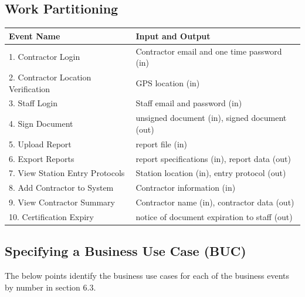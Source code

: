 \documentclass[12pt]{article}
\begin{document}
\subsection{Work Partitioning}
\begin{tabular}{|l|l|}
\hline
\textbf{Event Name} & \textbf{Input and Output} \\
\hline
1. Contractor Login & Contractor email and one time password (in) \\
\hline
2. Contractor Location Verification & GPS location (in) \\
\hline
3. Staff Login & Staff email and password (in) \\
\hline
4. Sign Document & unsigned document (in), signed document (out) \\
\hline
5. Upload Report & report file (in) \\
\hline
6. Export Reports & report specifications (in), report data (out)\\
\hline
7. View Station Entry Protocols & Station location (in), entry protocol (out)\\
\hline
8. Add Contractor to System & Contractor information (in) \\
\hline
9. View Contractor Summary & Contractor name (in), contractor data (out) \\
\hline
10. Certification Expiry & notice of document expiration to staff (out) \\
\hline
\end{tabular}

\subsection{Specifying a Business Use Case (BUC)}
The below points identify the business use cases for each of the
business events by number in section 6.3.\\
\end{document}
